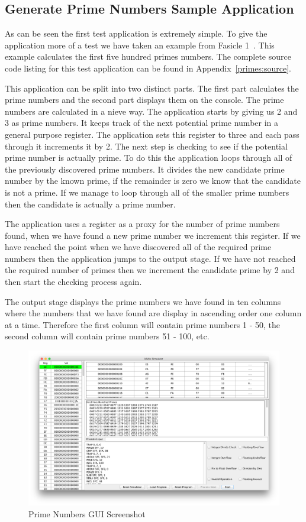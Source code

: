 \documentclass[a4paper,11pt]{report}
\begin{document}
\subsection{Generate Prime Numbers Sample Application}
\label{primenumbers}
As can be seen the first test application is extremely simple. To give the application more of a test we have taken an example from Fasicle 1~\cite{knuth:aocp2}. This example calculates the first five hundred primes numbers. The complete source code listing for this test application can be found in Appendix~\ref{primes:source}. 

This application can be split into two distinct parts. The first part calculates the prime numbers and the second part displays them on the console. The prime numbers are calculated in a nieve way. The application starts by giving us 2 and 3 as prime numbers. It keeps track of the next potential prime number in a general purpose register. The application sets this register to three and each pass through it increments it by 2.
\clearpage
The next step is checking to see if the potential prime number is actually prime. To do this the application loops through all of the previously discovered prime numbers. It divides the new candidate prime number by the known prime, if the remainder is zero we know that the candidate is not a prime. If we manage to loop through all of the smaller prime numbers then the candidate is actually a prime number.

The application uses a register as a proxy for the number of prime numbers found, when we have found a new prime number we increment this register. If we have reached the point when we have discovered all of the required prime numbers then the application jumps to the output stage. If we have not reached the required number of primes then we increment the candidate prime by 2 and then start the checking process again.

The output stage displays the prime numbers we have found in ten columns where the numbers that we have found are display in ascending order one column at a time. Therefore the first column will contain prime numbers 1 - 50, the second column will contain prime numbers 51 - 100, etc.

\begin{figure}[ht!]
\centering
\includegraphics[width=\textwidth]{GUISample3}
\caption{Prime Numbers GUI Screenshot}
\label{primes:gui}
\end{figure}
\end{document}
